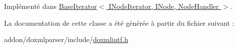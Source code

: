 Implémenté dans \hyperlink{class_base_iterator_a93b9aedc8f3aed39e3d2a0fa6d70240d}{Base\+Iterator$<$ I\+Node\+Iterator, I\+Node, Node\+Handler $>$}.



La documentation de cette classe a été générée à partir du fichier suivant \+:\begin{DoxyCompactItemize}
\item 
addon/doxmlparser/include/\hyperlink{include_2doxmlintf_8h}{doxmlintf.\+h}\end{DoxyCompactItemize}
